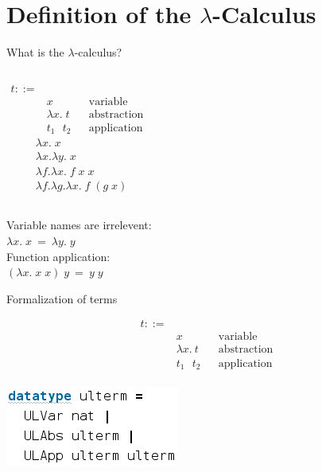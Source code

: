 \documentclass[xcolor=dvipsnames,notes]{beamer}
\begin{document}
\section{Definition of the $\lambda$-Calculus}

\begin{frame}{What is the $\lambda$-calculus?}
  \begin{columns}[c]
      \begin{align*}
        t ::= & \\
          & x && \text{variable} \\
          & \lambda x. \; t && \text{abstraction} \\
          & t_1 \text{ } t_2 && \text{application}
      \end{align*}
      \begin{align*}
        & \lambda x. \; x \\
        & \lambda x. \lambda y. \; x \\
        & \lambda f. \lambda x. \; f \; x \; x \\
        & \lambda f. \lambda g. \lambda x. \; f \; (g \; x)
      \end{align*}
  \end{columns}
  \vspace{20pt}
  \begin{center}
    Variable names are irrelevent: \\
    $\lambda x. \; x \: = \: \lambda y. \; y$ \\
    \vspace{20pt}
    Function application: \\
    $(\lambda x. \; x \; x) \; y \: = \: y \; y$
  \end{center}
\end{frame}

\begin{frame}{Formalization of terms}
  \begin{center}
    \small
    \begin{align*}
      t ::= & \\
        & x && \text{variable} \\
        & \lambda x. \ t && \text{abstraction} \\
        & t_1 \text{ } t_2 && \text{application}
    \end{align*}\\
    \vspace{20pt}
    \includegraphics[scale=0.4]{term.png}
  \end{center}
\end{frame}
\end{document}
